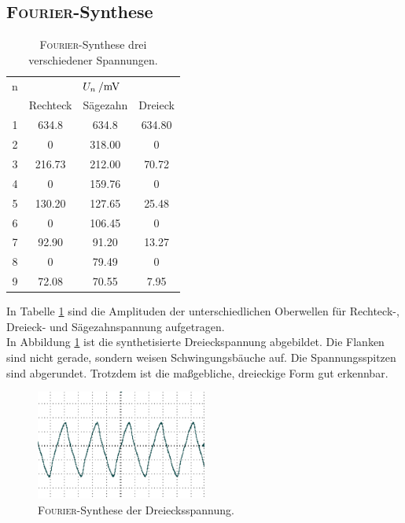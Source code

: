 \subsection{\textsc{Fourier}-Synthese}
\begin{table}[H]
	\centering
	\begin{tabular}{cccc}	
	\toprule
\multicolumn{1}{c}{n} & \multicolumn{3}{c}{$U_n\:/\si{\milli{\volt}}$}\\
	{} & {Rechteck} & {Sägezahn} & {Dreieck}\\
	\midrule
 1 & 634.8  & 634.8  & 634.80\\
 2 &   0    & 318.00 &   0\\
 3 & 216.73 & 212.00 &  70.72\\
 4 &   0    & 159.76 &   0\\
 5 & 130.20 & 127.65 &  25.48\\
 6 &   0    & 106.45 &   0\\
 7 &  92.90 &  91.20 &  13.27\\
 8 &   0    &  79.49 &   0\\
 9 &  72.08 &  70.55 &  7.95\\
	\bottomrule
	\end{tabular}
	\caption{\textsc{Fourier}-Synthese drei verschiedener Spannungen.}
	\label{tab:FS}
\end{table}
In Tabelle \ref{tab:FS} sind die Amplituden der unterschiedlichen Oberwellen für Rechteck-, Dreieck- und Sägezahnspannung aufgetragen.\\
In Abbildung \ref{fig:1-9_DE} ist die synthetisierte Dreieckspannung abgebildet. 
Die Flanken sind nicht gerade, sondern weisen Schwingungsbäuche auf. Die Spannungsspitzen sind abgerundet. Trotzdem ist die maßgebliche, dreieckige Form gut erkennbar.
\begin{figure}[ht]
	\centering
		\includegraphics[width=0.5\textwidth]{Bilder/1-9_DE.pdf}		
\caption{\textsc{Fourier}-Synthese der Dreiecksspannung. \cite{gimp}}
	\label{fig:1-9_DE}
\end{figure}
